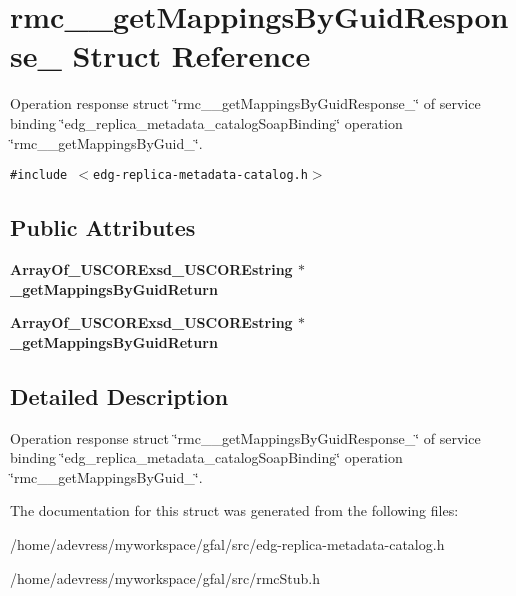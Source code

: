 \section{rmc\_\-\_\-get\-Mappings\-By\-Guid\-Response\_\- Struct Reference}
\label{structrmc____getMappingsByGuidResponse__}
Operation response struct \char`\"{}rmc\_\-\_\-get\-Mappings\-By\-Guid\-Response\_\-\char`\"{} of service binding \char`\"{}edg\_\-replica\_\-metadata\_\-catalog\-Soap\-Binding\char`\"{} operation \char`\"{}rmc\_\-\_\-get\-Mappings\-By\-Guid\_\-\char`\"{}.  


{\tt \#include $<$edg-replica-metadata-catalog.h$>$}

\subsection*{Public Attributes}
\begin{CompactItemize}
\item 
\bf{Array\-Of\_\-USCORExsd\_\-USCOREstring} $\ast$ \textbf{\_\-get\-Mappings\-By\-Guid\-Return}\label{structrmc____getMappingsByGuidResponse___e521d2471b544c5e608faf215bebe39b}

\item 
\bf{Array\-Of\_\-USCORExsd\_\-USCOREstring} $\ast$ \textbf{\_\-get\-Mappings\-By\-Guid\-Return}\label{structrmc____getMappingsByGuidResponse___e521d2471b544c5e608faf215bebe39b}

\end{CompactItemize}


\subsection{Detailed Description}
Operation response struct \char`\"{}rmc\_\-\_\-get\-Mappings\-By\-Guid\-Response\_\-\char`\"{} of service binding \char`\"{}edg\_\-replica\_\-metadata\_\-catalog\-Soap\-Binding\char`\"{} operation \char`\"{}rmc\_\-\_\-get\-Mappings\-By\-Guid\_\-\char`\"{}. 



The documentation for this struct was generated from the following files:\begin{CompactItemize}
\item 
/home/adevress/myworkspace/gfal/src/edg-replica-metadata-catalog.h\item 
/home/adevress/myworkspace/gfal/src/rmc\-Stub.h\end{CompactItemize}
